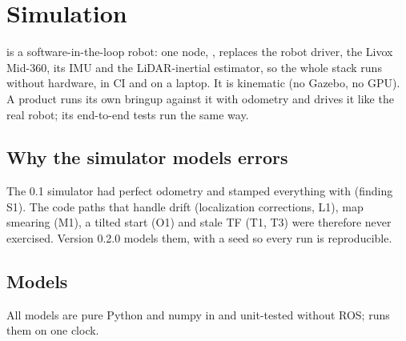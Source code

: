\chapter{Simulation}
\label{ch:sim}

 is a software-in-the-loop robot: one node, , replaces the
robot driver, the Livox Mid-360, its IMU and the LiDAR-inertial estimator, so the whole stack
runs without hardware, in CI and on a laptop. It is kinematic (no Gazebo, no GPU). A product runs
its own bringup against it with odometry  and drives it like the real
robot; its end-to-end tests run the same way.

\section{Why the simulator models errors}

The 0.1 simulator had perfect odometry and stamped everything with  (finding S1). The
code paths that handle drift (localization corrections, L1), map smearing (M1), a tilted start
(O1) and stale TF (T1, T3) were therefore never exercised. Version 0.2.0 models them, with a seed
so every run is reproducible.

\section{Models}

All models are pure Python and numpy in  and unit-tested without ROS;
 runs them on one clock.

